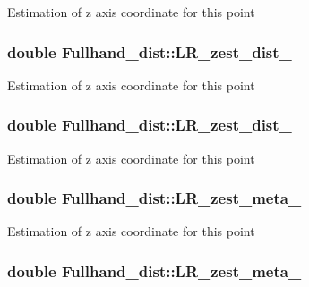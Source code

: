 Estimation of z axis coordinate for this point \hypertarget{classFullhand__dist_a2d07f7721b7b48ea60d37a064c5b8327}{
\subsubsection[{LR\_\-zest\_\-dist\_\-3}]{\setlength{\rightskip}{0pt plus 5cm}double {\bf Fullhand\_\-dist::LR\_\-zest\_\-dist\_}}}
\label{classFullhand__dist_a2d07f7721b7b48ea60d37a064c5b8327}
Estimation of z axis coordinate for this point \hypertarget{classFullhand__dist_afbf4f2922489eaea46e25dd5ebc1b6da}{
\subsubsection[{LR\_\-zest\_\-dist\_\-4}]{\setlength{\rightskip}{0pt plus 5cm}double {\bf Fullhand\_\-dist::LR\_\-zest\_\-dist\_}}}
\label{classFullhand__dist_afbf4f2922489eaea46e25dd5ebc1b6da}
Estimation of z axis coordinate for this point \hypertarget{classFullhand__dist_a27656e4d6e9529e5f279ba53b6a4b1da}{
\subsubsection[{LR\_\-zest\_\-meta\_\-1}]{\setlength{\rightskip}{0pt plus 5cm}double {\bf Fullhand\_\-dist::LR\_\-zest\_\-meta\_}}}
\label{classFullhand__dist_a27656e4d6e9529e5f279ba53b6a4b1da}
Estimation of z axis coordinate for this point \hypertarget{classFullhand__dist_a5a25f9d1332da1655d95b0df71a958e1}{
\subsubsection[{LR\_\-zest\_\-meta\_\-2}]{\setlength{\rightskip}{0pt plus 5cm}double {\bf Fullhand\_\-dist::LR\_\-zest\_\-meta\_}}}
\label{classFullhand__dist_a5a25f9d1332da1655d95b0df71a958e1}
